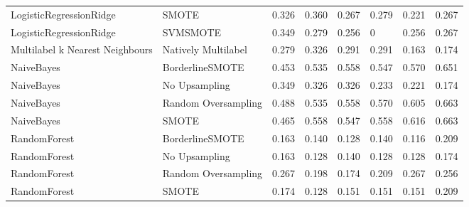 \begin{tabular}{llllllll}
        LogisticRegressionRidge &                         SMOTE & 0.326 &                     0.360 &                 0.267 &                  0.279 &                                   0.221 &     0.267 \\
        LogisticRegressionRidge &                      SVMSMOTE & 0.349 &                     0.279 &                 0.256 &                      0 &                                   0.256 &     0.267 \\
Multilabel k Nearest Neighbours &           Natively Multilabel & 0.279 &                     0.326 &                 0.291 &                  0.291 &                                   0.163 &     0.174 \\
                     NaiveBayes &               BorderlineSMOTE & 0.453 &                     0.535 &                 0.558 &                  0.547 &                                   0.570 &     0.651 \\
                     NaiveBayes &                 No Upsampling & 0.349 &                     0.326 &                 0.326 &                  0.233 &                                   0.221 &     0.174 \\
                     NaiveBayes &           Random Oversampling & 0.488 &                     0.535 &                 0.558 &                  0.570 &                                   0.605 &     0.663 \\
                     NaiveBayes &                         SMOTE & 0.465 &                     0.558 &                 0.547 &                  0.558 &                                   0.616 &     0.663 \\
                   RandomForest &               BorderlineSMOTE & 0.163 &                     0.140 &                 0.128 &                  0.140 &                                   0.116 &     0.209 \\
                   RandomForest &                 No Upsampling & 0.163 &                     0.128 &                 0.140 &                  0.128 &                                   0.128 &     0.174 \\
                   RandomForest &           Random Oversampling & 0.267 &                     0.198 &                 0.174 &                  0.209 &                                   0.267 &     0.256 \\
                   RandomForest &                         SMOTE & 0.174 &                     0.128 &                 0.151 &                  0.151 &                                   0.151 &     0.209 \\

\end{tabular}
